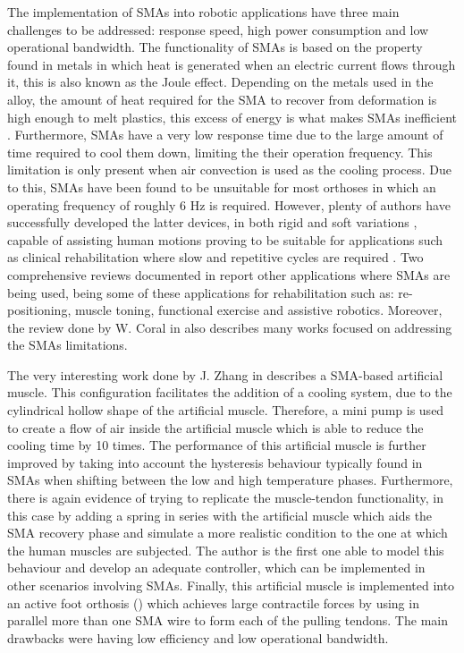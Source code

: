 The implementation of SMAs into robotic applications have three main challenges to be addressed: response speed, high power consumption and low operational bandwidth. The functionality of SMAs is based on the property found in metals in which heat is generated when an electric current flows through it, this is also known as the Joule effect. Depending on the metals used in the alloy, the amount of heat required for the SMA to recover from deformation is high enough to melt plastics, this excess of energy is what makes SMAs inefficient \cite{Bundhoo2009a,Bundhoo2009}. Furthermore, SMAs have a very low response time due to the large amount of time required to cool them down, limiting the their operation frequency. This limitation is only present when air convection is used as the cooling process. Due to this, SMAs have been found to be unsuitable for most orthoses in which an operating frequency of roughly 6 Hz is required. However, plenty of authors have successfully developed the latter devices, in both rigid \cite{tarkesh2007} and soft variations \cite{Stirling2011}, capable of assisting human motions proving to be suitable for applications such as clinical rehabilitation where slow and repetitive cycles are required \cite{Pittaccio2009,Chenal2014}. Two comprehensive reviews documented in \cite{pittaccio2012shape,Coral2012} report other applications where SMAs are being used, being some of these applications for rehabilitation such as: re-positioning, muscle toning, functional exercise and assistive robotics. Moreover, the review done by W. Coral in \cite{Coral2012} also describes many works focused on addressing the SMAs limitations.

The very interesting work done by J. Zhang in \cite{Zhang2013a} describes a SMA-based artificial muscle. This configuration facilitates the addition of a cooling system, due to the cylindrical hollow shape of the artificial muscle. Therefore, a mini pump is used to create a flow of air inside the artificial muscle which is able to reduce the cooling time by 10 times. The performance of this artificial muscle is further improved by taking into account the hysteresis behaviour typically found in SMAs when shifting between the low and high temperature phases. Furthermore, there is again evidence of trying to replicate the muscle-tendon functionality, in this case by adding a spring in series with the artificial muscle which aids the SMA recovery phase and simulate a more realistic condition to the one at which the human muscles are subjected. The author is the first one able to model this behaviour and develop an adequate controller, which can be implemented in other scenarios involving SMAs. Finally, this artificial muscle is implemented into an active foot orthosis () which achieves large contractile forces by using in parallel more than one SMA wire to form each of the pulling tendons. The main drawbacks were having low efficiency and low operational bandwidth.

